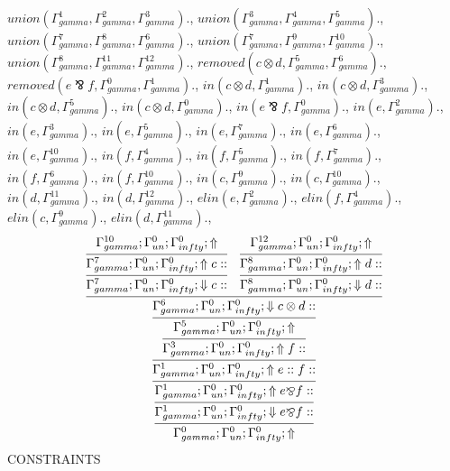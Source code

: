 \documentclass[a4paper, 11pt]{article}
\begin{document}
$union(\Gamma_{gamma}^{1}, \Gamma_{gamma}^{2}, \Gamma_{gamma}^{3}).$, $union(\Gamma_{gamma}^{3}, \Gamma_{gamma}^{4}, \Gamma_{gamma}^{5}).$, $union(\Gamma_{gamma}^{7}, \Gamma_{gamma}^{8}, \Gamma_{gamma}^{6}).$, $union(\Gamma_{gamma}^{7}, \Gamma_{gamma}^{9}, \Gamma_{gamma}^{10}).$, $union(\Gamma_{gamma}^{8}, \Gamma_{gamma}^{11}, \Gamma_{gamma}^{12}).$, $removed(c \otimes d, \Gamma_{gamma}^{5}, \Gamma_{gamma}^{6}).$, $removed(e \bindnasrepma f, \Gamma_{gamma}^{0}, \Gamma_{gamma}^{1}).$, $in(c \otimes d, \Gamma_{gamma}^{1}).$, $in(c \otimes d, \Gamma_{gamma}^{3}).$, $in(c \otimes d, \Gamma_{gamma}^{5}).$, $in(c \otimes d, \Gamma_{gamma}^{0}).$, $in(e \bindnasrepma f, \Gamma_{gamma}^{0}).$, $in(e, \Gamma_{gamma}^{2}).$, $in(e, \Gamma_{gamma}^{3}).$, $in(e, \Gamma_{gamma}^{5}).$, $in(e, \Gamma_{gamma}^{7}).$, $in(e, \Gamma_{gamma}^{6}).$, $in(e, \Gamma_{gamma}^{10}).$, $in(f, \Gamma_{gamma}^{4}).$, $in(f, \Gamma_{gamma}^{5}).$, $in(f, \Gamma_{gamma}^{7}).$, $in(f, \Gamma_{gamma}^{6}).$, $in(f, \Gamma_{gamma}^{10}).$, $in(c, \Gamma_{gamma}^{9}).$, $in(c, \Gamma_{gamma}^{10}).$, $in(d, \Gamma_{gamma}^{11}).$, $in(d, \Gamma_{gamma}^{12}).$, $elin(e, \Gamma_{gamma}^{2}).$, $elin(f, \Gamma_{gamma}^{4}).$, $elin(c, \Gamma_{gamma}^{9}).$, $elin(d, \Gamma_{gamma}^{11}).$, 
\[
\infer{\Gamma_{ gamma}^{0} ; \Gamma_{un}^{0} ; \Gamma_{ infty}^{0} ;  \Uparrow }
{\infer{\Gamma_{ gamma}^{1} ; \Gamma_{un}^{0} ; \Gamma_{ infty}^{0} ;  \Downarrow e \bindnasrepma f :: }
{\infer{\Gamma_{ gamma}^{1} ; \Gamma_{un}^{0} ; \Gamma_{ infty}^{0} ;  \Uparrow e \bindnasrepma f :: }
{\infer{\Gamma_{ gamma}^{1} ; \Gamma_{un}^{0} ; \Gamma_{ infty}^{0} ;  \Uparrow e :: f :: }
{\infer{\Gamma_{ gamma}^{3} ; \Gamma_{un}^{0} ; \Gamma_{ infty}^{0} ;  \Uparrow f :: }
{\infer{\Gamma_{ gamma}^{5} ; \Gamma_{un}^{0} ; \Gamma_{ infty}^{0} ;  \Uparrow }
{\infer{\Gamma_{ gamma}^{6} ; \Gamma_{un}^{0} ; \Gamma_{ infty}^{0} ;  \Downarrow c \otimes d :: }
{\infer{\Gamma_{ gamma}^{7} ; \Gamma_{un}^{0} ; \Gamma_{ infty}^{0} ;  \Downarrow c :: }
{\infer{\Gamma_{ gamma}^{7} ; \Gamma_{un}^{0} ; \Gamma_{ infty}^{0} ;  \Uparrow c :: }
{\Gamma_{ gamma}^{10} ; \Gamma_{un}^{0} ; \Gamma_{ infty}^{0} ;  \Uparrow }}
&
\infer{\Gamma_{ gamma}^{8} ; \Gamma_{un}^{0} ; \Gamma_{ infty}^{0} ;  \Downarrow d :: }
{\infer{\Gamma_{ gamma}^{8} ; \Gamma_{un}^{0} ; \Gamma_{ infty}^{0} ;  \Uparrow d :: }
{\Gamma_{ gamma}^{12} ; \Gamma_{un}^{0} ; \Gamma_{ infty}^{0} ;  \Uparrow }}}}}}}}}
\]
CONSTRAINTS
\end{document}
